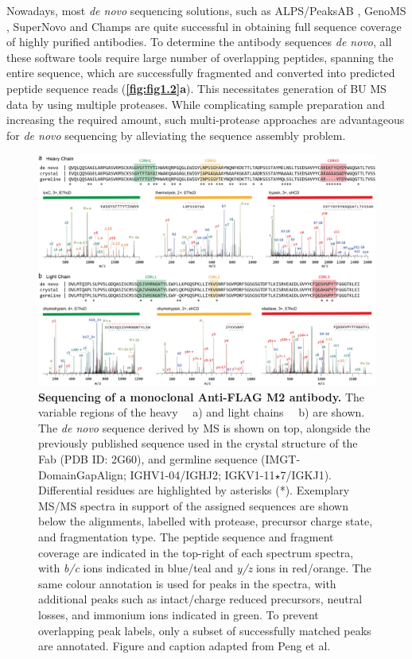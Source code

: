 Nowadays, most \emph{de novo} sequencing solutions, such as ALPS/PeaksAB \cite{tran2016complete}, GenoMS \cite{castellana2010template}, SuperNovo \cite{sen2017automated} and Champs \cite{liu2009automated} are quite successful in obtaining full sequence coverage of highly purified antibodies. To determine the antibody sequences \emph{de novo}, all these software tools require large number of overlapping peptides, spanning the entire sequence, which are successfully fragmented and converted into predicted peptide sequence reads (\textbf{\autoref{fig:fig1.2}a}). This necessitates generation of BU MS data by using multiple proteases. While complicating sample preparation and increasing the required amount, such multi-protease approaches are advantageous for \emph{de novo} sequencing by alleviating the sequence assembly problem.
\begin{figure}[!htb]
  \center
  \includegraphics[]{Chapter.1/Figures/f3.png}
  \caption{
    \textbf{Sequencing of a monoclonal Anti-FLAG M2 antibody.} The variable regions of the heavy ~~a) and light chains ~~b) are shown. The \emph{de novo} sequence derived by MS is shown on top, alongside the previously published sequence used in the crystal structure of the Fab (PDB ID: 2G60), and germline sequence (IMGT-DomainGapAlign; IGHV1-04/IGHJ2; IGKV1-11$\star$7/IGKJ1). Differential residues are highlighted by asterisks (*). Exemplary MS/MS spectra in support of the assigned sequences are shown below the alignments, labelled with protease, precursor charge state, and fragmentation type. The peptide sequence and fragment coverage are indicated in the top-right of each spectrum spectra, with \emph{b/c} ions indicated in blue/teal and \emph{y/z} ions in red/orange. The same colour annotation is used for peaks in the spectra, with additional peaks such as intact/charge reduced precursors, neutral losses, and immonium ions indicated in green. To prevent overlapping peak labels, only a subset of successfully matched peaks are annotated. Figure and caption adapted from Peng et al. \cite{peng2021mass}
  }
  \label{fig:fig1.3}
\end{figure}


